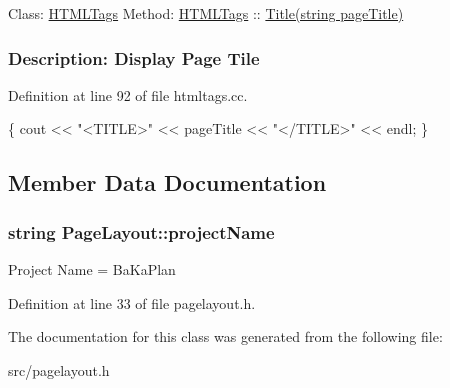  Class\-: \hyperlink{classHTMLTags}{H\-T\-M\-L\-Tags} Method\-: \hyperlink{classHTMLTags}{H\-T\-M\-L\-Tags} \-:\-: \hyperlink{classHTMLTags_a5128d6f1c6be5ac1689047fc9d0d159f_a5128d6f1c6be5ac1689047fc9d0d159f}{Title(string page\-Title)} \subsubsection*{Description\-: Display Page Tile}

Definition at line 92 of file htmltags.\-cc.


\begin{DoxyCode}
\{
    cout << \textcolor{stringliteral}{"<TITLE>"} << pageTitle << \textcolor{stringliteral}{"</TITLE>"} << endl;
\}
\end{DoxyCode}


\subsection{Member Data Documentation}
\hypertarget{classPageLayout_a8a3c1ddc422df2556fbc95d0cd575a05_a8a3c1ddc422df2556fbc95d0cd575a05}{
\subsubsection[{project\-Name}]{\setlength{\rightskip}{0pt plus 5cm}string Page\-Layout\-::project\-Name\hspace{0.3cm}{\ttfamily [protected]}}}\label{d7/d9e/classPageLayout_a8a3c1ddc422df2556fbc95d0cd575a05_a8a3c1ddc422df2556fbc95d0cd575a05}
Project Name = Ba\-Ka\-Plan 

Definition at line 33 of file pagelayout.\-h.



The documentation for this class was generated from the following file\-:\begin{DoxyCompactItemize}
\item 
src/pagelayout.\-h\end{DoxyCompactItemize}
